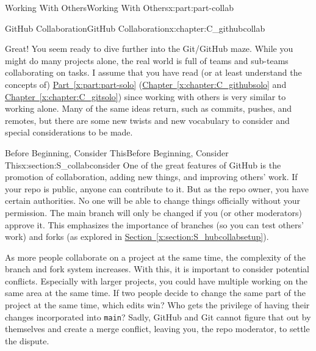 \documentclass[oneside,10pt,]{book}
\newcommand{\xreffont}{\relax}
\newcommand{\mono}[1]{\texttt{#1}}
\begin{document}
\begin{partptx}{Working With Others}{}{Working With Others}{}{}{x:part:part-collab}
%
\typeout{************************************************}
\typeout{************************************************}
%
\begin{chapterptx}{GitHub Collaboration}{}{GitHub Collaboration}{}{}{x:chapter:C_githubcollab}
\begin{introduction}{}%
Great! You seem ready to dive further into the Git\slash{}GitHub maze. While you might do many projects alone, the real world is full of teams and sub-teams collaborating on tasks. I assume that you have read (or at least understand the concepts of) \hyperref[x:part:part-solo]{Part~{\xreffont\ref{x:part:part-solo}}} (\hyperref[x:chapter:C_githubsolo]{Chapter~{\xreffont\ref{x:chapter:C_githubsolo}}} and \hyperref[x:chapter:C_gitsolo]{Chapter~{\xreffont\ref{x:chapter:C_gitsolo}}}) since working with others is very similar to working alone. Many of the same ideas return, such as commits, pushes, and remotes, but there are some new twists and new vocabulary to consider and special considerations to be made.%
\end{introduction}%
%
%
\typeout{************************************************}
\typeout{************************************************}
%
\begin{sectionptx}{Before Beginning, Consider This}{}{Before Beginning, Consider This}{}{}{x:section:S_collabconsider}
%
%
One of the great features of GitHub is the promotion of collaboration, adding new things, and improving others' work. If your repo is public, anyone can contribute to it. But as the repo owner, you have certain authorities. No one will be able to change things officially without your permission. The main branch will only be changed if you (or other moderators) approve it. This emphasizes the importance of branches (so you can test others' work) and forks (as explored in \hyperref[x:section:S_hubcollabsetup]{Section~{\xreffont\ref{x:section:S_hubcollabsetup}}}).%
\par
As more people collaborate on a project at the same time, the complexity of the branch and fork system increases. With this, it is important to consider potential conflicts. Especially with larger projects, you could have multiple working on the same area at the same time. If two people decide to change the same part of the project at the same time, which edits win? Who gets the privilege of having their changes incorporated into \mono{main}? Sadly, GitHub and Git cannot figure that out by themselves and create a merge conflict, leaving you, the repo moderator, to settle the dispute.%

\end{sectionptx}
\end{chapterptx}
\end{partptx}
\end{document}
